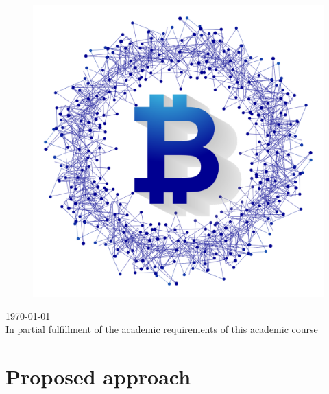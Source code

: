\documentclass[12pt]{scrreprt}
\begin{document}
\begin{titlepage}
\begin{center}
\begin{figure}[htb]
{\begin{minipage}{0.59\linewidth}
		\includegraphics[width=1\linewidth,%
				  keepaspectratio]{bitcoinImageTrans.png}
		\end{minipage}%
		}%
		\end{figure}

		{\Large \today \\ \vspace{10pt}}
			{\Large In partial fulfillment of the academic requirements of this academic course}
	\end{center}%
\end{titlepage}

\renewcommand{\contentsname}{Table of Contents}
\tableofcontents
\listoffigures
\listoftables

\newpage 

\chapter{Proposed approach}
\end{document}
